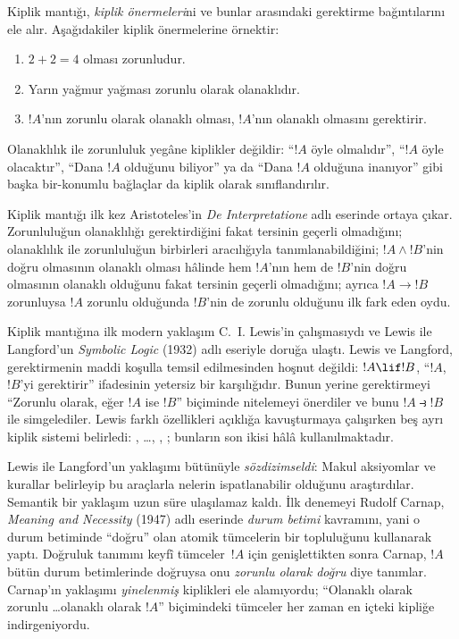 



Kiplik mantığı, \emph{kiplik önermeleri}ni ve bunlar arasındaki gerektirme
bağıntılarını ele alır. Aşağıdakiler kiplik önermelerine örnektir:
\begin{enumerate}
\item $2+2=4$ olması zorunludur.
\item Yarın yağmur yağması zorunlu olarak olanaklıdır.
\item $!A$'nın zorunlu olarak olanaklı olması, $!A$'nın olanaklı olmasını
  gerektirir.
\end{enumerate}
Olanaklılık ile zorunluluk yegâne kiplikler değildir: ``$!A$ öyle
olmalıdır'', ``$!A$ öyle olacaktır'', ``Dana $!A$ olduğunu biliyor'' ya da
``Dana $!A$ olduğuna inanıyor'' gibi başka bir-konumlu bağlaçlar da kiplik
olarak sınıflandırılır.

Kiplik mantığı ilk kez Aristoteles'in \emph{De Interpretatione} adlı
eserinde ortaya çıkar. Zorunluluğun olanaklılığı gerektirdiğini fakat tersinin
geçerli olmadığını; olanaklılık ile zorunluluğun birbirleri aracılığıyla
tanımlanabildiğini; $!A \land !B$'nin doğru olmasının olanaklı olması hâlinde
hem $!A$'nın hem de $!B$'nin doğru olmasının olanaklı olduğunu fakat tersinin
geçerli olmadığını; ayrıca $!A \to !B$ zorunluysa $!A$ zorunlu olduğunda
$!B$'nin de zorunlu olduğunu ilk fark eden oydu.

Kiplik mantığına ilk modern yaklaşım C.~I. Lewis'in çalışmasıydı ve Lewis ile
Langford'un \emph{Symbolic Logic} (1932) adlı eseriyle doruğa ulaştı. Lewis
ve Langford, gerektirmenin maddi koşulla temsil edilmesinden hoşnut değildi:
$!A \lif !B$, ``$!A$, $!B$'yi gerektirir'' ifadesinin yetersiz bir
karşılığıdır. Bunun yerine gerektirmeyi ``Zorunlu olarak, eğer $!A$ ise
$!B$'' biçiminde nitelemeyi önerdiler ve bunu $!A \strictif !B$ ile
simgelediler. Lewis farklı özellikleri açıklığa kavuşturmaya çalışırken beş
ayrı kiplik sistemi belirledi: , \ldots, , ;
bunların son ikisi hâlâ kullanılmaktadır.

Lewis ile Langford'un yaklaşımı bütünüyle \emph{sözdizimseldi}: Makul
aksiyomlar ve kurallar belirleyip bu araçlarla nelerin ispatlanabilir olduğunu
araştırdılar. Semantik bir yaklaşım uzun süre ulaşılamaz kaldı. İlk denemeyi
Rudolf Carnap, \emph{Meaning and Necessity} (1947) adlı eserinde
\emph{durum betimi} kavramını, yani o durum betiminde ``doğru'' olan atomik
tümcelerin bir topluluğunu kullanarak yaptı. Doğruluk tanımını keyfî
tümceler~$!A$ için genişlettikten sonra Carnap, $!A$ bütün durum betimlerinde
doğruysa onu \emph{zorunlu olarak doğru} diye tanımlar. Carnap'ın yaklaşımı
\emph{yinelenmiş} kiplikleri ele alamıyordu; ``Olanaklı olarak zorunlu
\ldots olanaklı olarak $!A$'' biçimindeki tümceler her zaman en içteki
kipliğe indirgeniyordu.

